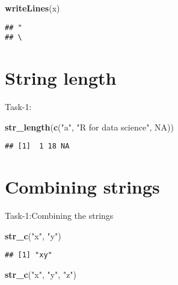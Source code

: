 \documentclass[
]{article}
\newenvironment{Shaded}{\begin{snugshade}}{\end{snugshade}}
\newcommand{\ConstantTok}[1]{\textcolor[rgb]{0.56,0.35,0.01}{#1}}
\newcommand{\FunctionTok}[1]{\textcolor[rgb]{0.13,0.29,0.53}{\textbf{#1}}}
\newcommand{\NormalTok}[1]{#1}
\newcommand{\StringTok}[1]{\textcolor[rgb]{0.31,0.60,0.02}{#1}}
\begin{document}
\begin{Shaded}
\begin{Highlighting}[]
\FunctionTok{writeLines}\NormalTok{(x)}
\end{Highlighting}
\end{Shaded}

\begin{verbatim}
## "
## \
\end{verbatim}

\hypertarget{string-length}{%
\section{String length}\label{string-length}}

Task-1:

\begin{Shaded}
\begin{Highlighting}[]
\FunctionTok{str\_length}\NormalTok{(}\FunctionTok{c}\NormalTok{(}\StringTok{"a"}\NormalTok{, }\StringTok{"R for data science"}\NormalTok{, }\ConstantTok{NA}\NormalTok{))}
\end{Highlighting}
\end{Shaded}

\begin{verbatim}
## [1]  1 18 NA
\end{verbatim}

\hypertarget{combining-strings}{%
\section{Combining strings}\label{combining-strings}}

Task-1:Combining the strings

\begin{Shaded}
\begin{Highlighting}[]
\FunctionTok{str\_c}\NormalTok{(}\StringTok{"x"}\NormalTok{, }\StringTok{"y"}\NormalTok{)}
\end{Highlighting}
\end{Shaded}

\begin{verbatim}
## [1] "xy"
\end{verbatim}

\begin{Shaded}
\begin{Highlighting}[]
\FunctionTok{str\_c}\NormalTok{(}\StringTok{"x"}\NormalTok{, }\StringTok{"y"}\NormalTok{, }\StringTok{"z"}\NormalTok{)}
\end{Highlighting}
\end{Shaded}
\end{document}
